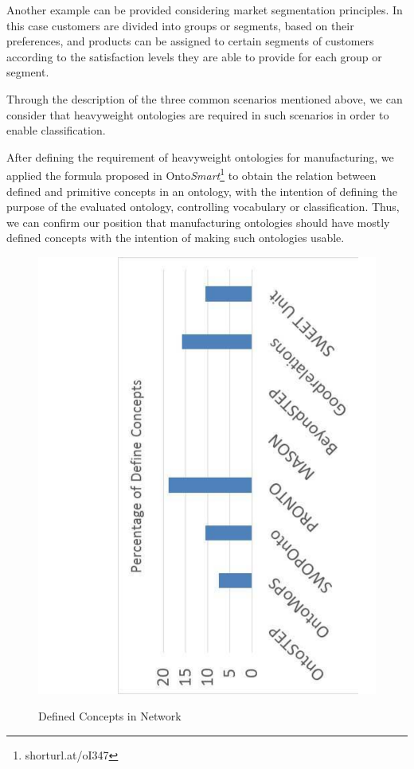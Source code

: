 Another example can be provided considering market segmentation principles. In this case customers are divided into groups or segments, based on their preferences, and products can be assigned to certain segments of customers according to the satisfaction levels they are able to provide for each group or segment. 

Through the description of the three common scenarios mentioned above, we can consider that heavyweight ontologies are required in such scenarios in order to enable classification. 

After defining the requirement of heavyweight ontologies for manufacturing, we applied the formula proposed in Onto\textit{Smart}\footnote{shorturl.at/oI347} to obtain the relation between defined and primitive concepts in an ontology, with the intention of defining the purpose of the evaluated ontology, controlling vocabulary or classification.  Thus, we can confirm our position that manufacturing ontologies should have mostly defined concepts with the intention of making such ontologies usable.   



\begin{figure}
\begin{center}
	\includegraphics[scale=0.5, angle=-90]{figure-chapterIV/fig4-29.pdf}\\
	\caption{Defined    Concepts in Network}
	\label{figure4-29}
\end{center}
\end{figure}



